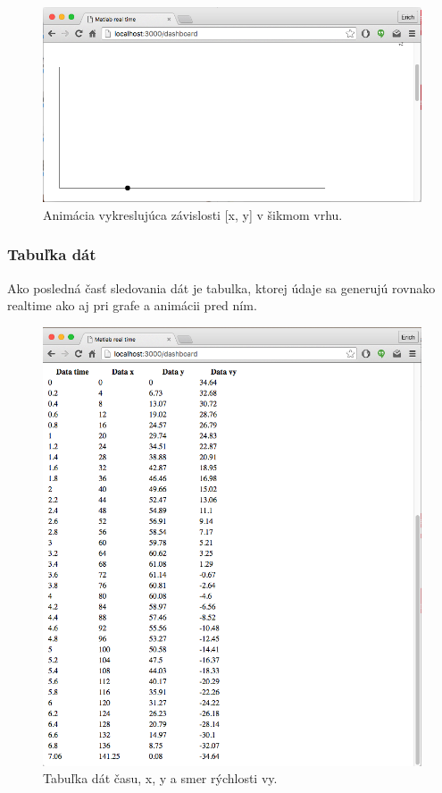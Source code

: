 \begin{figure}[H]
  \centering
  \includegraphics[scale=0.5]{img/code/angular-canvas.png}
  \caption{Animácia vykreslujúca závislosti [x, y] v šikmom vrhu.}
  \label{img-angular-canvas}
\end{figure}

\subsubsection{Tabuľka dát}

Ako posledná časť sledovania dát je tabulka, ktorej údaje sa generujú rovnako realtime ako aj pri grafe a animácii pred ním.

\begin{figure}[H]
  \centering
  \includegraphics[scale=0.5]{img/code/angular-table.png}
  \caption{Tabuľka dát času, x, y a smer rýchlosti vy.}
  \label{img-angular-table}
\end{figure}


